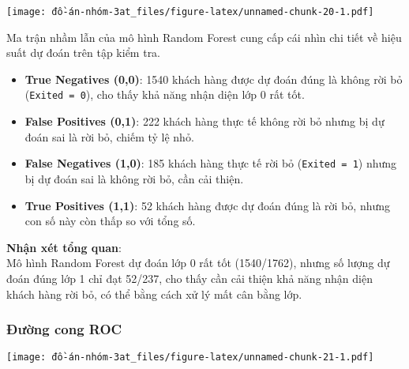 \documentclass[
]{article}
\newenvironment{Shaded}{\begin{snugshade}}{\end{snugshade}}
\newcommand{\AttributeTok}[1]{\textcolor[rgb]{0.13,0.29,0.53}{#1}}
\newcommand{\ConstantTok}[1]{\textcolor[rgb]{0.56,0.35,0.01}{#1}}
\newcommand{\DecValTok}[1]{\textcolor[rgb]{0.00,0.00,0.81}{#1}}
\newcommand{\FunctionTok}[1]{\textcolor[rgb]{0.13,0.29,0.53}{\textbf{#1}}}
\newcommand{\NormalTok}[1]{#1}
\newcommand{\OtherTok}[1]{\textcolor[rgb]{0.56,0.35,0.01}{#1}}
\newcommand{\SpecialCharTok}[1]{\textcolor[rgb]{0.81,0.36,0.00}{\textbf{#1}}}
\newcommand{\StringTok}[1]{\textcolor[rgb]{0.31,0.60,0.02}{#1}}
\providecommand{\tightlist}{%
  \setlength{\itemsep}{0pt}\setlength{\parskip}{0pt}}
\begin{document}
\texttt{[image: đồ-án-nhóm-3at\_files/figure-latex/unnamed-chunk-20-1.pdf]}

Ma trận nhầm lẫn của mô hình Random Forest cung cấp cái nhìn chi tiết về
hiệu suất dự đoán trên tập kiểm tra.

\begin{itemize}
\tightlist
\item
  \textbf{True Negatives (0,0)}: 1540 khách hàng được dự đoán đúng là
  không rời bỏ (\texttt{Exited\ =\ 0}), cho thấy khả năng nhận diện lớp
  0 rất tốt.
\item
  \textbf{False Positives (0,1)}: 222 khách hàng thực tế không rời bỏ
  nhưng bị dự đoán sai là rời bỏ, chiếm tỷ lệ nhỏ.
\item
  \textbf{False Negatives (1,0)}: 185 khách hàng thực tế rời bỏ
  (\texttt{Exited\ =\ 1}) nhưng bị dự đoán sai là không rời bỏ, cần cải
  thiện.
\item
  \textbf{True Positives (1,1)}: 52 khách hàng được dự đoán đúng là rời
  bỏ, nhưng con số này còn thấp so với tổng số.
\end{itemize}

\textbf{Nhận xét tổng quan}:\\
Mô hình Random Forest dự đoán lớp 0 rất tốt (1540/1762), nhưng số lượng
dự đoán đúng lớp 1 chỉ đạt 52/237, cho thấy cần cải thiện khả năng nhận
diện khách hàng rời bỏ, có thể bằng cách xử lý mất cân bằng lớp.

\subsubsection{Đường cong ROC}\label{sec-rf-roc}

\begin{Shaded}
\end{Shaded}

\texttt{[image: đồ-án-nhóm-3at\_files/figure-latex/unnamed-chunk-21-1.pdf]}
\end{document}
